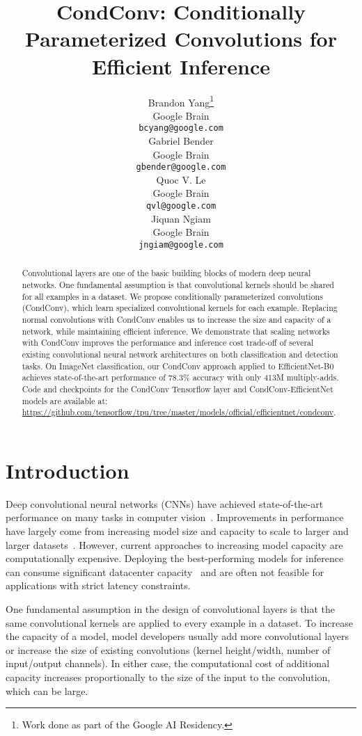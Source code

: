 \documentclass{article}
\title{CondConv: Conditionally Parameterized Convolutions for Efficient Inference}
\author{Brandon Yang\thanks{Work done as part of the Google AI Residency.}\\
  Google Brain\\
  \texttt{bcyang@google.com} \\
   \And
   Gabriel Bender \\
   Google Brain \\
   \texttt{gbender@google.com} \\
   \AND
   Quoc V. Le \\
   Google Brain \\
   \texttt{qvl@google.com} \\
   \And
   Jiquan Ngiam \\
   Google Brain \\
   \texttt{jngiam@google.com} \\
}
\def\codename{CondConv}
\begin{document}
\maketitle

\begin{abstract}
Convolutional layers are one of the basic building blocks of modern deep neural networks. One fundamental assumption is that convolutional kernels should be shared for all examples in a dataset. We propose conditionally parameterized convolutions (\codename{}), which learn specialized convolutional kernels for each example. Replacing normal convolutions with \codename{} enables us to increase the size and capacity of a network, while maintaining efficient inference. We demonstrate that scaling networks with \codename{} improves the performance and inference cost trade-off of several existing convolutional neural network architectures on both classification and detection tasks. On ImageNet classification, our \codename{} approach applied to EfficientNet-B0 achieves state-of-the-art performance of 78.3\% accuracy with only 413M multiply-adds. Code and checkpoints for the \codename{} Tensorflow layer and \codename{}-EfficientNet models are available at: \url{https://github.com/tensorflow/tpu/tree/master/models/official/efficientnet/condconv}. 



\end{abstract}

\section{Introduction}

Deep convolutional neural networks (CNNs) have achieved state-of-the-art performance on many tasks in computer vision~\cite{lecun1990handwritten,alexnet12}. Improvements in performance have largely come from increasing model size and capacity to scale to larger and larger datasets~\cite{mahajan2018exploring,gpipe18,amoebanets18}. However, current approaches to increasing model capacity are computationally expensive. Deploying the best-performing models for inference can consume significant datacenter capacity~\cite{jouppi2017datacenter} and are often not feasible for applications with strict latency constraints.





One fundamental assumption in the design of convolutional layers is that the same convolutional kernels are applied to every example in a dataset. To increase the capacity of a model, model developers usually add more convolutional layers or increase the size of existing convolutions (kernel height/width, number of input/output channels). In either case, the computational cost of additional capacity increases proportionally to the size of the input to the convolution, which can be large.
\end{document}
